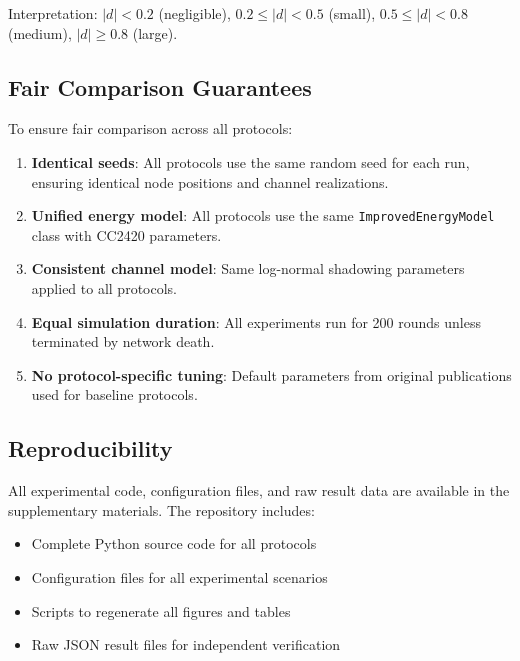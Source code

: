 Interpretation: $|d| < 0.2$ (negligible), $0.2 \leq |d| < 0.5$ (small),
$0.5 \leq |d| < 0.8$ (medium), $|d| \geq 0.8$ (large).

\subsection{Fair Comparison Guarantees}

To ensure fair comparison across all protocols:

\begin{enumerate}
    \item \textbf{Identical seeds}: All protocols use the same random seed
    for each run, ensuring identical node positions and channel realizations.

    \item \textbf{Unified energy model}: All protocols use the same
    \texttt{ImprovedEnergyModel} class with CC2420 parameters.

    \item \textbf{Consistent channel model}: Same log-normal shadowing
    parameters applied to all protocols.

    \item \textbf{Equal simulation duration}: All experiments run for 200
    rounds unless terminated by network death.

    \item \textbf{No protocol-specific tuning}: Default parameters from
    original publications used for baseline protocols.
\end{enumerate}

\subsection{Reproducibility}

All experimental code, configuration files, and raw result data are
available in the supplementary materials. The repository includes:

\begin{itemize}
    \item Complete Python source code for all protocols
    \item Configuration files for all experimental scenarios
    \item Scripts to regenerate all figures and tables
    \item Raw JSON result files for independent verification
\end{itemize}

